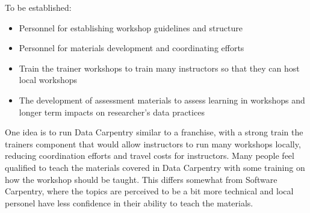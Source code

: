 \documentclass[11pt]{article}
\begin{document}
To be established:
\begin{itemize}
\item Personnel for establishing workshop guidelines and structure
\item Personnel for materials development and coordinating efforts
\item Train the trainer workshops to train many instructors so that they can host local
workshops
\item The development of assessment materials to assess learning in workshops and longer term impacts on 
researcher's data practices
\end{itemize}

One idea is to run Data Carpentry similar to a franchise, with a strong train the 
trainers component that would allow instructors to run many workshops locally, 
reducing coordination efforts and travel costs for instructors. Many people feel 
qualified to teach the materials covered in Data Carpentry with some training on 
how the workshop should be taught. This differs somewhat from Software Carpentry, where
the topics are perceived to be a bit more technical and local personel have less 
confidence in their ability to teach the materials.
\end{document}
